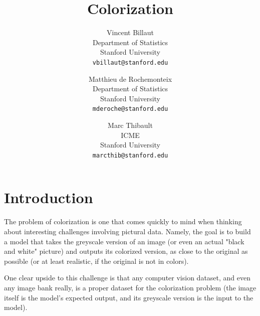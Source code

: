 \documentclass[10pt,twocolumn,letterpaper]{article}
\begin{document}
\title{Colorization}

\author{Vincent Billaut\\
Department of Statistics\\
Stanford University\\
{\tt\small vbillaut@stanford.edu}
\and
Matthieu de Rochemonteix\\
Department of Statistics\\
Stanford University\\
{\tt\small mderoche@stanford.edu}
\and
Marc Thibault\\
ICME\\
Stanford University\\
{\tt\small marcthib@stanford.edu}
}

\maketitle



%

\section{Introduction}

The problem of colorization is one that comes quickly to mind when thinking about interesting challenges involving pictural data. Namely, the goal is to build a model that takes the greyscale version of an image (or even an actual "black and white" picture) and outputs its colorized version, as close to the original as possible (or at least realistic, if the original is not in colors).

One clear upside to this challenge is that any computer vision dataset, and even any image bank really, is a proper dataset for the colorization problem (the image itself is the model's expected output, and its greyscale version is the input to the model).
\end{document}
